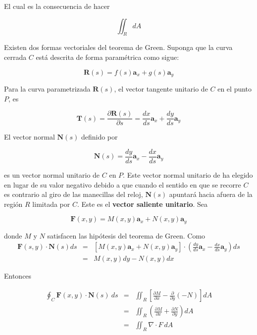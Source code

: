 El cual es la consecuencia de hacer

\begin{equation*}
\iint_R dA
\end{equation*}


Existen dos formas vectoriales del teorema de Green. Suponga que la curva cerrada $C$ está descrita de forma paramétrica como sigue:

\begin{equation*}
\mathbf{R}(s) = f(s) \mathbf{a}_x + g(s) \mathbf{a}_y
\end{equation*}

Para la curva parametrizada $\mathbf{R}(s)$, el vector tangente unitario de $C$ en el punto $P$, es 

\begin{equation*}
\mathbf{T}(s) = \frac{\partial \mathbf{R}(s)}{\partial s} = \frac{d x}{d s} \mathbf{a}_x + \frac{d y}{d s} \mathbf{a}_y
\end{equation*}

El vector normal $\mathbf{N}(s)$ definido por

\begin{equation*}
\mathbf{N}(s) = \frac{d y}{d s} \mathbf{a}_x - \frac{dx}{ds} \mathbf{a}_y
\end{equation*}

es un vector normal unitario de $C$ en $P$. Este vector normal unitario de ha elegido en lugar de su valor negativo debido a que cuando el sentido en que se recorre $C$ es contrario al giro de las manecillas del reloj, $\mathbf{N}(s)$ apuntará hacia afuera de la región $R$ limitada por $C$. Este es el \textbf{vector saliente unitario}. Sea

\begin{equation*}
\mathbf{F}(x,y) = M(x,y) \mathbf{a}_x + N(x,y) \mathbf{a}_y
\end{equation*}

donde $M$ y $N$ satisfacen las hipótesis del teorema de Green. Como
\begin{eqnarray*}
\mathbf{F}(s,y) \cdot \mathbf{N}(s) ds &=& \left[ M(x,y) \mathbf{a}_x + N(x,y) \mathbf{a}_y \right] \cdot \left( \frac{dy}{ds} \mathbf{a}_x - \frac{dx}{ds} \mathbf{a}_y \right) ds \\
&=& M(x,y) dy - N(x,y) dx
\end{eqnarray*}

Entonces 

\begin{eqnarray*}
\oint_C \mathbf{F}(x,y) \cdot \mathbf{N}(s) \ ds &=& \iint_R \left[ \frac{\partial M}{\partial x} - \frac{\partial}{\partial y} (-N) \right] dA \\
&=& \iint_R \left( \frac{\partial M}{\partial x} + \frac{\partial N}{\partial y} \right) dA \\
&=& \iint_R \nabla \cdot F \ dA
\end{eqnarray*}

